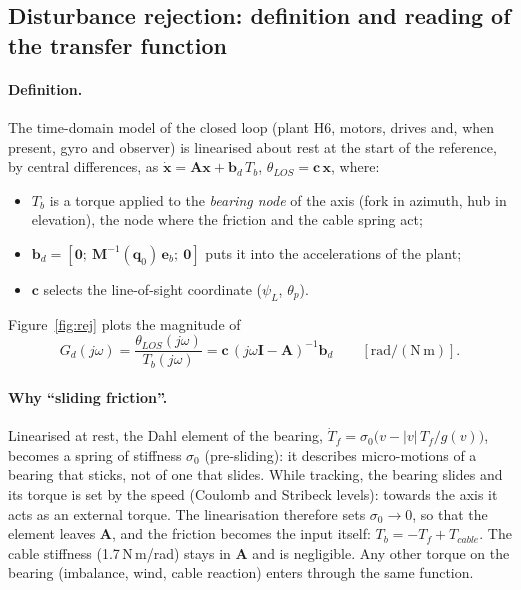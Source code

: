 \documentclass[10pt,a4paper]{article}
\numberwithin{equation}{section}
\begin{document}
\subsection{Disturbance rejection: definition and reading of the transfer function}\label{sec:rejection}
\paragraph{Definition.} The time-domain model of the closed loop (plant H6, motors, drives and, when present, gyro and observer) is linearised about rest at the start of the reference, by central differences, as $\dot{\mathbf x}=\mathbf A\mathbf x+\mathbf b_d\,T_b$, $\theta_{LOS}=\mathbf c\,\mathbf x$, where:
\begin{itemize}
\item $T_b$ is a torque applied to the \emph{bearing node} of the axis (fork in azimuth, hub in elevation), the node where the friction and the cable spring act;
\item $\mathbf b_d=[\mathbf 0;\ \mathbf M^{-1}(\mathbf q_0)\,\mathbf e_b;\ \mathbf 0]$ puts it into the accelerations of the plant;
\item $\mathbf c$ selects the line-of-sight coordinate ($\psi_L$, $\theta_p$).
\end{itemize}
Figure~\ref{fig:rej} plots the magnitude of
\begin{equation}
G_d(j\omega)=\frac{\theta_{LOS}(j\omega)}{T_b(j\omega)}=\mathbf c\,(j\omega\mathbf I-\mathbf A)^{-1}\mathbf b_d\qquad[\mathrm{rad/(N\,m)}].\label{eq:gd}
\end{equation}

\paragraph{Why ``sliding friction''.} Linearised at rest, the Dahl element of the bearing, $\dot T_f=\sigma_0\bigl(v-|v|\,T_f/g(v)\bigr)$, becomes a spring of stiffness $\sigma_0$ (pre-sliding): it describes micro-motions of a bearing that sticks, not of one that slides. While tracking, the bearing slides and its torque is set by the speed (Coulomb and Stribeck levels): towards the axis it acts as an external torque. The linearisation therefore sets $\sigma_0\to0$, so that the element leaves $\mathbf A$, and the friction becomes the input itself: $T_b=-T_f+T_{cable}$. The cable stiffness (1.7\,N\,m/rad) stays in $\mathbf A$ and is negligible. Any other torque on the bearing (imbalance, wind, cable reaction) enters through the same function.
\end{document}

